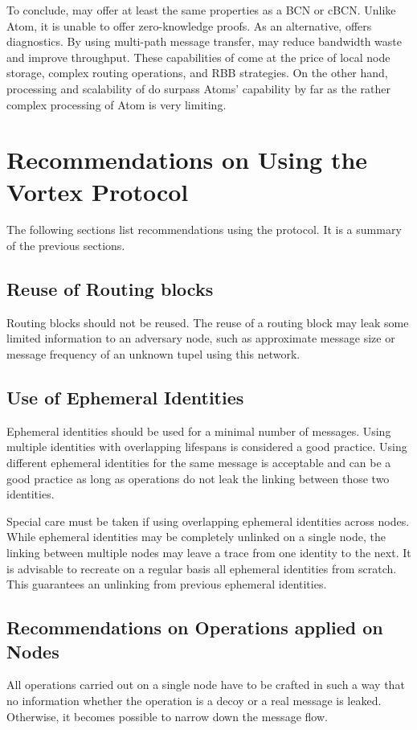 To conclude, \MessageVortex{} may offer at least the same properties as a BCN or cBCN. Unlike Atom, it is unable to offer zero-knowledge proofs. As an alternative, \MessageVortex{} offers diagnostics. By using multi-path message transfer, \MessageVortex{} may reduce bandwidth waste and improve throughput. These capabilities of \MessageVortex{} come at the price of local node storage, complex routing operations, and RBB strategies. On the other hand, processing and scalability of \MessageVortex{} do surpass Atoms' capability by far as the rather complex processing of Atom is very limiting.

\chapter{Recommendations on Using the Vortex Protocol}
The following sections list recommendations using the \MessageVortex{} protocol. It is a summary of the previous sections.

\section{Reuse of Routing blocks\label{sec:reuseRB}}
Routing blocks should not be reused. The reuse of a routing block may leak some limited information to an adversary node, such as approximate message size or message frequency of an unknown tupel using this network.

\section{Use of Ephemeral Identities}
Ephemeral identities should be used for a minimal number of messages. Using multiple identities with overlapping lifespans is considered a good practice. Using different ephemeral identities for the same message is acceptable and can be a good practice as long as operations do not leak the linking between those two identities.

Special care must be taken if using overlapping ephemeral identities across nodes. While ephemeral identities may be completely unlinked on a single node, the linking between multiple nodes may leave a trace from one identity to the next. It is advisable to recreate on a regular basis all ephemeral identities from scratch. This guarantees an unlinking from previous ephemeral identities.

\section{Recommendations on Operations applied on Nodes}
All operations carried out on a single node have to be crafted in such a way that no information whether the operation is a decoy or a real message is leaked. Otherwise, it becomes possible to narrow down the message flow.


